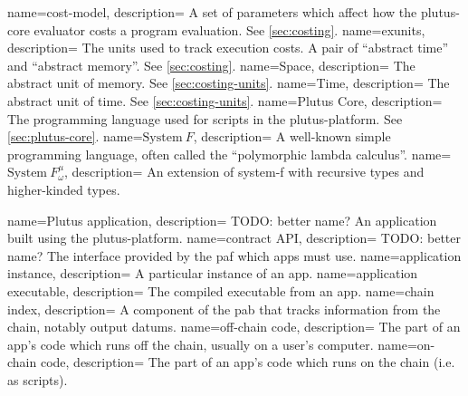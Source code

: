 {
  name=cost-model,
  description={
    A set of parameters which affect how the \gls{plutus-core} evaluator costs a program evaluation.
    See \cref{sec:costing}.
  }
}
{
  name=exunits,
  description={
    The units used to track execution costs.
    A pair of ``abstract time'' and ``abstract memory''.
    See \cref{sec:costing}.
  }
}
{
  name=Space,
  description={
    The abstract unit of memory.
    See \cref{sec:costing-units}.
  }
}
{
  name=Time,
  description={
    The abstract unit of time.
    See \cref{sec:costing-units}.
  }
}
{
  name=Plutus Core,
  description={
    The programming language used for \glspl{script} in the \gls{plutus-platform}.
    See \cref{sec:plutus-core}.
  }
}
{
  name={\ensuremath{\textrm{System}\ F}},
  description={
    A well-known simple programming language, often called the ``polymorphic lambda calculus''.
  }
}
{
  name={\ensuremath{\textrm{System}\ F_{\omega}^\mu}},
  description={
    An extension of \gls{system-f} with recursive types and higher-kinded types.
  }
}

{
  name=Plutus application,
  description={
    TODO: better name?
    An application built using the \gls{plutus-platform}.
  }
}
{
  name=contract API,
  description={
    TODO: better name?
    The interface provided by the \gls{paf} which \glspl{app} must use.
  }
}
{
  name=application instance,
  description={
    A particular instance of an \gls{app}.
  }
}
{
  name=application executable,
  description={
    The compiled executable from an \gls{app}.
  }
}
{
  name=chain index,
  description={
    A component of the \gls{pab} that tracks information from the chain, notably output \glspl{datum}.
  }
}
{
  name=off-chain code,
  description={
    The part of an \gls{app}'s code which runs off the chain, usually on a user's computer.
  }
}
{
  name=on-chain code,
  description={
    The part of an \gls{app}'s code which runs on the chain (i.e. as scripts).
  }
}

